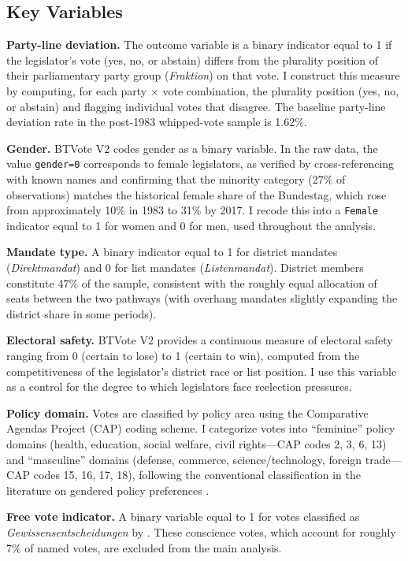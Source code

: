 \documentclass[12pt]{article}
\begin{document}
\subsection{Key Variables}

\textbf{Party-line deviation.} The outcome variable is a binary indicator equal to 1 if the legislator's vote (yes, no, or abstain) differs from the plurality position of their parliamentary party group (\textit{Fraktion}) on that vote. I construct this measure by computing, for each party $\times$ vote combination, the plurality position (yes, no, or abstain) and flagging individual votes that disagree. The baseline party-line deviation rate in the post-1983 whipped-vote sample is 1.62\%.

\textbf{Gender.} BTVote V2 codes gender as a binary variable. In the raw data, the value \texttt{gender=0} corresponds to female legislators, as verified by cross-referencing with known names and confirming that the minority category (27\% of observations) matches the historical female share of the Bundestag, which rose from approximately 10\% in 1983 to 31\% by 2017. I recode this into a \texttt{Female} indicator equal to 1 for women and 0 for men, used throughout the analysis.

\textbf{Mandate type.} A binary indicator equal to 1 for district mandates (\textit{Direktmandat}) and 0 for list mandates (\textit{Listenmandat}). District members constitute 47\% of the sample, consistent with the roughly equal allocation of seats between the two pathways (with overhang mandates slightly expanding the district share in some periods).

\textbf{Electoral safety.} BTVote V2 provides a continuous measure of electoral safety ranging from 0 (certain to lose) to 1 (certain to win), computed from the competitiveness of the legislator's district race or list position. I use this variable as a control for the degree to which legislators face reelection pressures.

\textbf{Policy domain.} Votes are classified by policy area using the Comparative Agendas Project (CAP) coding scheme. I categorize votes into ``feminine'' policy domains (health, education, social welfare, civil rights---CAP codes 2, 3, 6, 13) and ``masculine'' domains (defense, commerce, science/technology, foreign trade---CAP codes 15, 16, 17, 18), following the conventional classification in the literature on gendered policy preferences \citep{swers2002, reher2018}.

\textbf{Free vote indicator.} A binary variable equal to 1 for votes classified as \textit{Gewissensentscheidungen} by \citet{hohendorf2022}. These conscience votes, which account for roughly 7\% of named votes, are excluded from the main analysis.
\end{document}
